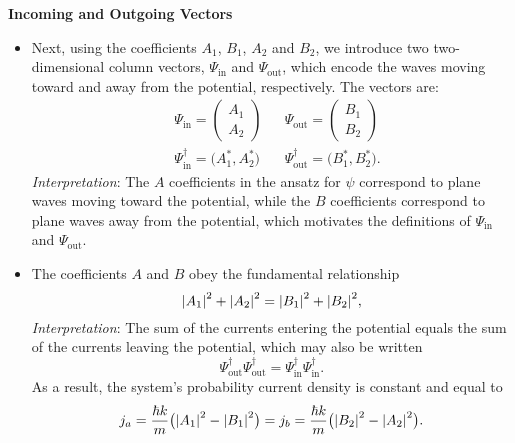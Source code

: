\documentclass[11pt, a4paper]{article}
\begin{document}
\textbf{Incoming and Outgoing Vectors}
\begin{itemize}
    \item Next, using the coefficients $ A_{1} $, $ B_{1} $, $ A_{2} $ and $ B_{2} $, we introduce two two-dimensional column vectors, $ \Psi_{\text{in}} $ and $ \Psi_{\text{out}} $, which encode the waves moving toward and away from the potential, respectively. The vectors are:
    \begin{align*}
        & \Psi_{\text{in}} = 
        \begin{pmatrix}
            A_{1}\\
            A_{2}
        \end{pmatrix}
        && \Psi_{\text{out}} = 
        \begin{pmatrix}
            B_{1} \\
            B_{2}
        \end{pmatrix}\\
        & \Psi_{\text{in}}^{\dagger} = \big( A_{1}^{*}, A_{2}^{*} \big)
        && \Psi_{\text{out}}^{\dagger} = \big( B_{1}^{*}, B_{2}^{*} \big).
    \end{align*}
    \textit{Interpretation}: The $ A $ coefficients in the ansatz for $ \psi $ correspond to plane waves moving toward the potential, while the $ B $ coefficients correspond to plane waves away from the potential, which motivates the definitions of $ \Psi_{\text{in}} $ and $ \Psi_{\text{out}} $.

    \item The coefficients $ A $ and $ B $ obey the fundamental relationship
    \begin{equation*}
        \abs{A_{1}}^{2} + \abs{A_{2}}^{2} = \abs{B_{1}}^{2} + \abs{B_{2}}^{2},
    \end{equation*}
    \textit{Interpretation}: The sum of the currents entering the potential equals the sum of the currents leaving the potential, which may also be written
    \begin{equation*}
        \Psi_{\text{out}}^{\dagger} \Psi_{\text{out}}^{\dagger} = \Psi_{\text{in}}^{\dagger} \Psi_{\text{in}}^{\dagger}.
    \end{equation*}
    As a result, the system's probability current density is constant and equal to
    \begin{equation*}
        j_{a} = \frac{\hbar k}{m} \big( \abs{A_{1}}^{2} - \abs{B_{1}}^{2} \big) = j_{b} = \frac{\hbar k}{m} \big( \abs{B_{2}}^{2} - \abs{A_{2}}^{2} \big).
    \end{equation*}
    
\end{itemize}
\end{document}
